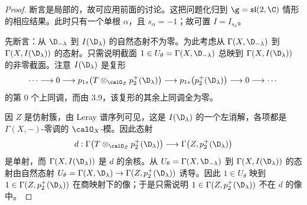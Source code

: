 \begin{proof}
断言是局部的，故可应用前面的讨论。这把问题化归到 $\g=\mathfrak{sl}(2,\C)$ 情形的相应结果。此时只有一个单根 $\alpha$，且 $s_\alpha=-1$；故可置 $I=I_{s_\alpha}$。

先断言：从 $\D_{-\lambda}$ 到 $I(\D_\lambda)$ 的自然态射不为零。为此考虑从 $\Gamma(X,\D_{-\lambda})$ 到 $\Gamma(X,I(\D_\lambda))$ 的态射。只需说明截面 $1\in U_\theta=\Gamma(X,\D_{-\lambda})$ 总映到 $\Gamma(X,I(\D_\lambda))$ 的非零截面。注意 $I(\D_\lambda)$ 是复形
$$\cdots\longrightarrow0\longrightarrow p_{1*}\bigl(T\otimes_{\calO_Z}p_2^+(\D_\lambda)\bigr)\longrightarrow p_{1*}\bigl(p_2^+(\D_\lambda)\bigr)\longrightarrow0\longrightarrow\cdots$$
的第 0 个上同调，而由 3.9，该复形的其余上同调全为零。

因 $Z$ 是仿射簇，由 Leray 谱序列可见，这是 $I(\D_\lambda)$ 的一个左消解，各项都是 $\Gamma(X,-)$-零调的 $\calO_X$-模。因此态射
$$d:\Gamma\bigl(T\otimes_{\calO_Z}p_2^+(\D_\lambda)\bigr)\longrightarrow\Gamma\bigl(Z,p_2^+(\D_\lambda)\bigr)$$
是单射，而 $\Gamma(X,I(\D_\lambda))$ 是 $d$ 的余核。从 $U_\theta=\Gamma(X,\D_{-\lambda})$ 到 $\Gamma(X,I(\D_\lambda))$ 的态射由自然态射 $U_\theta=\Gamma(X,\D_\lambda)\to\Gamma(Z,p_2^+(\D_\lambda))$ 诱导。因此 $1\in U_\theta$ 映到 $1\in\Gamma(Z,p_2^+(\D_\lambda))$ 在商映射下的像；于是只需说明 $1\in\Gamma(Z,p_2^+(\D_\lambda))$ 不在 $d$ 的像中。


\end{proof}
